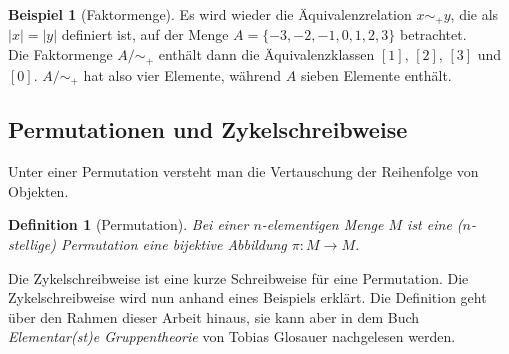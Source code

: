 \documentclass[12pt,a4paper, usenames, dvipsnames]{article}
\theoremstyle{mystyle}
\newtheorem{definition}{Definition}
\theoremstyle{definition}
\newtheorem{bsp}{Beispiel}[definition]
\begin{document}
\begin{bsp}[Faktormenge]

Es wird wieder die Äquivalenzrelation $x \sim_+ y$, die als $|x| =|y|$ definiert ist, auf der Menge $A=\{ -3, -2, -1, 0, 1, 2, 3 \}$ betrachtet.  \\
Die Faktormenge $A / \sim_+$ enthält dann die Äquivalenzklassen $[1]$, $[2]$, $[3]$ und $[0]$. $A / \sim_+$ hat also vier Elemente, während $A$ sieben Elemente enthält.

\end{bsp}



%
%
%
%
%
%
%
%
%
%
%
%
%
\subsection{Permutationen und Zykelschreibweise} 
 \label{Abschnitt_PermutationZykel}

Unter einer Permutation versteht man die Vertauschung der Reihenfolge von Objekten.

\begin{definition}[Permutation]
Bei einer $n$-elementigen Menge $M$ ist eine ($n$-stellige) Permutation eine bijektive Abbildung $\pi  : M \rightarrow M$.
\end{definition}
Die Zykelschreibweise ist eine kurze Schreibweise für eine Permutation.
Die Zykelschreibweise wird nun anhand eines Beispiels erklärt. Die Definition geht über den Rahmen dieser Arbeit hinaus, sie kann aber in dem Buch \textit{Elementar(st)e Gruppentheorie} von Tobias Glosauer \cite{Buch} nachgelesen werden.
\end{document}
